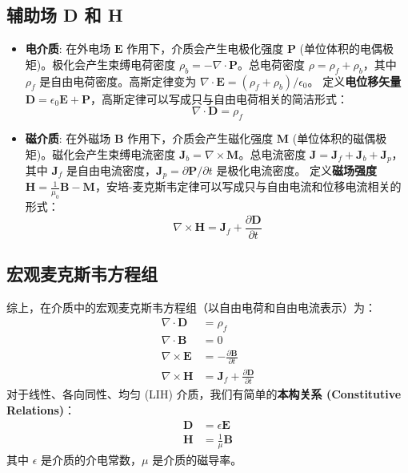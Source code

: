 \documentclass[fontset=none]{ctexart}
\begin{document}
\subsection{辅助场 D 和 H}
\begin{itemize}
    \item \textbf{电介质}: 在外电场 $\bm{E}$ 作用下，介质会产生电极化强度 $\bm{P}$ (单位体积的电偶极矩)。极化会产生束缚电荷密度 $\rho_b = -\nabla \cdot \bm{P}$。总电荷密度 $\rho = \rho_f + \rho_b$，其中 $\rho_f$ 是自由电荷密度。高斯定律变为 $\nabla \cdot \bm{E} = (\rho_f + \rho_b)/\epsilon_0$。
    定义\textbf{电位移矢量} $\bm{D} = \epsilon_0 \bm{E} + \bm{P}$，高斯定律可以写成只与自由电荷相关的简洁形式：
    \begin{equation}
        \nabla \cdot \bm{D} = \rho_f
    \end{equation}
    \item \textbf{磁介质}: 在外磁场 $\bm{B}$ 作用下，介质会产生磁化强度 $\bm{M}$ (单位体积的磁偶极矩)。磁化会产生束缚电流密度 $\bm{J}_b = \nabla \times \bm{M}$。总电流密度 $\bm{J} = \bm{J}_f + \bm{J}_b + \bm{J}_p$，其中 $\bm{J}_f$ 是自由电流密度，$\bm{J}_p = \partial\bm{P}/\partial t$ 是极化电流密度。
    定义\textbf{磁场强度} $\bm{H} = \frac{1}{\mu_0}\bm{B} - \bm{M}$，安培-麦克斯韦定律可以写成只与自由电流和位移电流相关的形式：
    \begin{equation}
        \nabla \times \bm{H} = \bm{J}_f + \frac{\partial \bm{D}}{\partial t}
    \end{equation}
\end{itemize}

\subsection{宏观麦克斯韦方程组}
综上，在介质中的宏观麦克斯韦方程组（以自由电荷和自由电流表示）为：
\begin{align}
    \nabla \cdot \bm{D} &= \rho_f \label{eq:maxwell1_matter} \\
    \nabla \cdot \bm{B} &= 0 \label{eq:maxwell2_matter} \\
    \nabla \times \bm{E} &= -\frac{\partial\bm{B}}{\partial t} \label{eq:maxwell3_matter} \\
    \nabla \times \bm{H} &= \bm{J}_f + \frac{\partial \bm{D}}{\partial t} \label{eq:maxwell4_matter}
\end{align}
对于线性、各向同性、均匀 (LIH) 介质，我们有简单的\textbf{本构关系 (Constitutive Relations)}：
\begin{align}
    \bm{D} &= \epsilon \bm{E} \\
    \bm{H} &= \frac{1}{\mu} \bm{B}
\end{align}
其中 $\epsilon$ 是介质的介电常数，$\mu$ 是介质的磁导率。
\end{document}
